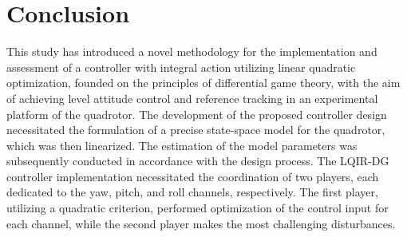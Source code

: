\documentclass[3p,times]{elsarticle}
\begin{document}
\section{Conclusion}\label{sec:conclusion}

\noindent This study has introduced a novel methodology for the implementation and assessment of a controller with integral action utilizing linear quadratic optimization, founded on the principles of differential game theory, with the aim of achieving level attitude control and reference tracking in an experimental platform of the quadrotor.
The development of the proposed controller design necessitated the formulation of a precise state-space model for the quadrotor, which was then linearized. The estimation of the model parameters was subsequently conducted in accordance with the design process.
The LQIR-DG controller implementation necessitated the coordination of two players, each dedicated to the yaw, pitch, and roll channels, respectively.
The first player, utilizing a quadratic criterion, performed optimization of the control input for each channel, while the second player makes the most challenging disturbances.
\end{document}

